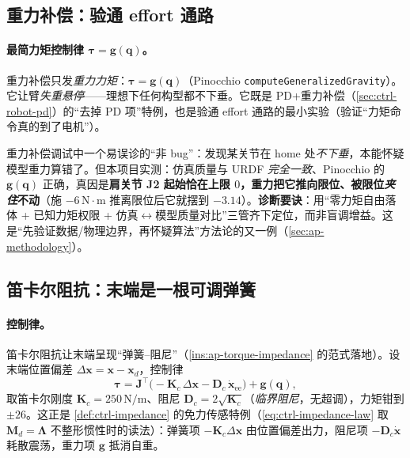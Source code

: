 \subsection{重力补偿：验通 effort 通路}
\label{sec:ap-gravcomp}

\paragraph{最简力矩控制律 $\boldsymbol{\tau}=\mathbf{g}(\mathbf{q})$。}
重力补偿只发\emph{重力力矩}：$\boldsymbol{\tau}=\mathbf{g}(\mathbf{q})$（Pinocchio \texttt{computeGeneralizedGravity}）。它让臂\emph{失重悬停}——理想下任何构型都不下垂。它既是 PD+重力补偿（\cref{sec:ctrl-robot-pd}）的“去掉 PD 项”特例，也是验通 effort 通路的最小实验（验证“力矩命令真的到了电机”）。

\begin{pitfall}\label{pit:ap-gravcomp-limit}
重力补偿调试中一个易误诊的“非 bug”：发现某关节在 home 处\emph{不下垂}，本能怀疑模型重力算错了。但本项目实测：仿真质量与 URDF \emph{完全一致}、Pinocchio 的 $\mathbf{g}(\mathbf{q})$ 正确，真因是\textbf{肩关节 J2 起始恰在上限 $0$，重力把它推向限位、被限位\emph{夹住}不动}（施 $-6\,\mathrm{N\!\cdot\! m}$ 推离限位后它就摆到 $-3.14$）。\textbf{诊断要诀}：用“零力矩自由落体 + 已知力矩权限 + 仿真$\leftrightarrow$模型质量对比”三管齐下定位，而非盲调增益。这是“先验证数据/物理边界，再怀疑算法”方法论的又一例（\cref{sec:ap-methodology}）。
\end{pitfall}

\subsection{笛卡尔阻抗：末端是一根可调弹簧}
\label{sec:ap-cartimp}

\paragraph{控制律。}
笛卡尔阻抗让末端呈现“弹簧--阻尼”（\cref{ins:ap-torque-impedance} 的范式落地）。设末端位置偏差 $\Delta\mathbf{x}=\mathbf{x}-\mathbf{x}_d$，控制律
\begin{equation}
  \boxed{\boldsymbol{\tau}=\mathbf{J}^\top\big(-\mathbf{K}_c\,\Delta\mathbf{x}-\mathbf{D}_c\,\dot{\mathbf{x}}_{\mathrm{ee}}\big)+\mathbf{g}(\mathbf{q}),}
  \label{eq:ap-cartimp}
\end{equation}
取笛卡尔刚度 $\mathbf{K}_c=250\,\mathrm{N/m}$、阻尼 $\mathbf{D}_c=2\sqrt{\mathbf{K}_c}$（\emph{临界阻尼}，无超调），力矩钳到 $\pm 26$。这正是 \cref{def:ctrl-impedance} 的免力传感特例（\cref{eq:ctrl-impedance-law} 取 $\mathbf{M}_d=\boldsymbol{\Lambda}$ 不整形惯性时的读法）：弹簧项 $-\mathbf{K}_c\Delta\mathbf{x}$ 由位置偏差出力，阻尼项 $-\mathbf{D}_c\dot{\mathbf{x}}$ 耗散震荡，重力项 $\mathbf{g}$ 抵消自重。

